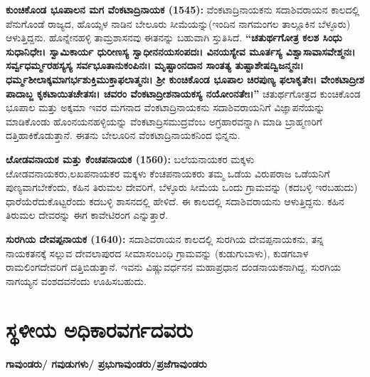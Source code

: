 \textbf{ಕುಂಚಿಕೊಂಡ ಭೂಪಾಲನ ಮಗ ವೆಂಕಟಾದ್ರಿನಾಯಕ (1545):} ವೆಂಕಟಾದ್ರಿನಾಯಕನು ಸದಾಶಿವರಾಯನ ಕಾಲದಲ್ಲಿ ಪೆನುಗೊಂಡೆ ರಾಜ್ಯದ, ಹೊಯ್ಸಳ ನಾಡಿನ ಬೇಲೂರು ಸೀಮೆಯನ್ನು(ಇಂದಿನ ನಾಗಮಂಗಲ ತಾಲ್ಲೂಕಿನ ಬೆಳ್ಳೂರು) ಆಳುತ್ತಿದ್ದನು. ಹೊನ್ನೇನಹಳ್ಳಿ ತಾಮ್ರಶಾಸನವು ಈತನನ್ನು ಬಹುವಾಗಿ ಸ್ತುತಿಸಿದೆ. \textbf{“ಚತುರ್ಥಗೋತ್ರ ಕಲಶ ಸಿಂಧು ಸುಧಾನಿಧೇಃ। ಸ್ವಾಮಿಕಾರ್ಯ ಧುರೀಣಸ್ಯ ಸ್ವಾಧೀನನಯಸಂಪದಃ। ವಿನಯಸ್ಯೇವ ಮೂರ್ತಸ್ಯ ವಿಶ್ವಾಸಾವಾಸವೇಶ್ಮನಃ। ಸರ್ವ್ವಧರ್ಮ್ಮರಹಸ್ಯಸ್ಯ ಸರ್ವಭೂತಾನುಕಂಪಿನಃ। ಮೃಷ್ಟಾಂನದಾನ ಸಾಂತತ್ಯ ತುಷ್ಟಾಶೇಷದ್ವಿಜನ್ಮನಃ। ಧರ್ಮ್ಮಶೀಲಾಕ್ಕಮಾಗರ್ಭಶುಕ್ತಿಮುಕ್ತಾಫಲಾತ್ಮನಃ। ಶ‍್ರೀ ಕುಂಚಿಕೊಂಡ ಭೂಪಾಲ ಚಿರಪುಣ್ಯ ಫಲಾಕೃತೇಃ। ವೇಂಕಟಾದ್ರೀಶ ಪಾದಾಬ್ಜ ಕೃಕಟಾಯಿತಚೇತಸಃ। ಚವರಂ\general{\break } ವೆಂಕಟಾದ್ರೀಶನಾಯಕಸ್ಯ ನಯೋಂನತೇಃ।”} ಚತುರ್ಥಗೋತ್ರದ ಕುಂಚಿಕೊಂಡ ಭೂಪಾಲ ಮತ್ತು ಅಕ್ಕಮಾ ಇವರ ಮಗನಾದ ವೆಂಕಟಾದ್ರಿನಾಯಕನು ಸದಾಶಿವರಾಯನಿಗೆ ವಿಜ್ಞಾಪನೆಯನ್ನು ಮಾಡಿಕೊಂಡು ಹೊಂನಯನಹಳ್ಳಿಯನ್ನು ವೆಂಕಟಾದ್ರಿಸಮುದ್ರ\-ವೆಂಬ ಅಗ್ರಹಾರವನ್ನಾಗಿ ಮಾಡಿ ಬ್ರಾಹ್ಮಣರಿಗೆ ದತ್ತಿಹಾಕಿಕೊಡುತ್ತಾನೆ. ಈತನು ಬೇಲೂರಿನ ವೆಂಕಟಾದ್ರಿನಾಯಕನಿಂದ ಭಿನ್ನನು.

\textbf{ೞೋಡವನಾಯಕ ಮತ್ತು ಕೆಂಚಪನಾಯಕ (1560): }ಬಲೆಯನಾಯಕರ ಮಕ್ಕಳು ೞೋಡವನಾಯಕರು,\break ಲಖಪನಾಯಕರ ಮಕ್ಕಳು ಕೆಂಚಪನಾಯಕರು ತಮ್ಮ ಒಡೆಯ ವಿರುಪರಾಜ ಒಡೆಯನಿಗೆ ಪುಣ್ಯವಾಗಬೇಕೆಂದು, ಕಹಿನ ತಿರುಮಲ ದೇವರಿಗೆ, ಬೆಳ್ಳೂರು ಸೀಮೆಯ ಒಂದು ಗ್ರಾಮವನ್ನು (ಕದಬಳ್ಳಿ ಇರಬಹುದು) ಧಾರೆಯೆರೆದುಕೊಟ್ಟರೆಂದು ಕದಬಳ್ಳಿ ಶಾಸನದಲ್ಲಿ ಹೇಳಿದೆ. ಈ ಕಾಲದಲ್ಲಿ ಸದಾಶಿವರಾಯನು ಆಳುತ್ತಿದ್ದನು. ಕಹಿನ ತಿರುಮಲ ದೇವರನ್ನು ಈಗ ಕಾವೇಟಿರಂಗ ಎನ್ನುತ್ತಾರೆ.

\textbf{ಸುರಗಿಯ ದೇವಪ್ಪನಾಯಕ (1640):} ಸದಾಶಿವರಾಯನ ಕಾಲದಲ್ಲಿ ಸುರಗಿಯ ದೇವಪ್ಪನಾಯಕನು, ತನ್ನ ನಾಯಕ\-ತನಕ್ಕೆ ಸಲ್ಲುವ ದೇವಲಾಪುರದ ಸೀಮಾಸಂಬಂಧಿ ಗ್ರಾಮವನ್ನು (ಕುಡುಗುಬಾಳು), ಕುಡಗಬಾಳ ರಾಮಲಿಂಗದೇವರಿಗೆ ದತ್ತಿಬಿಡುತ್ತಾನೆ. ಇವನು ವಿಷ್ಣುವರ್ಧನನ ಮಹಾಪ್ರಧಾನ ದಂಡನಾಯಕನಾಗಿದ್ದ, ಸುರಗಿಯ ನಾಗಯ್ಯನ ವಂಶದವನೆಂದು ಊಹಿಸಬಹುದು.


\section{ಸ್ಥಳೀಯ ಅಧಿಕಾರವರ್ಗದವರು}

\textbf{ಗಾವುಂಡರು/ ಗವುಡುಗಳು/ ಪ್ರಭುಗಾವುಂಡರು/ಪ್ರಜೆಗಾವುಂಡರು}

